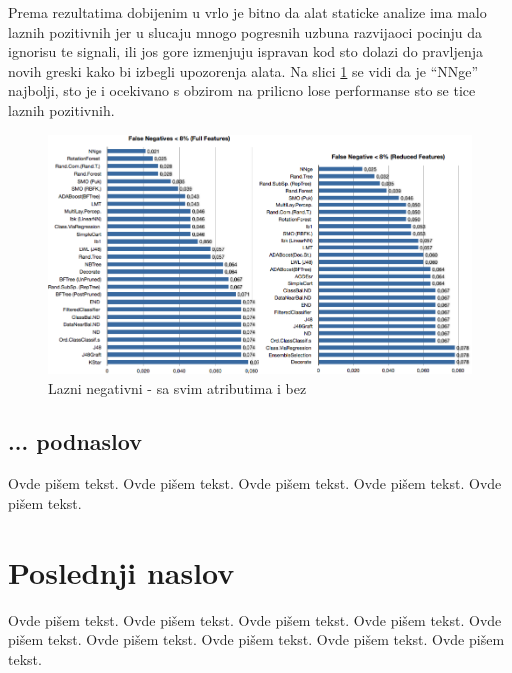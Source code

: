 \documentclass[a4paper]{article}
\begin{document}
{%

Prema rezultatima dobijenim u  \cite{baca} vrlo je bitno da alat staticke analize ima malo laznih pozitivnih jer
u slucaju mnogo pogresnih uzbuna razvijaoci pocinju da ignorisu te signali, ili jos gore izmenjuju ispravan kod sto dolazi 
do pravljenja novih greski kako bi izbegli upozorenja alata. Na slici \ref{fig:falseNeg} se vidi da je ``NNge'' najbolji, sto je i ocekivano s obzirom na prilicno 
lose performanse sto se tice laznih pozitivnih.

\begin{figure}[h!]
\centering
\includegraphics[width=\textwidth]{false_negative.png}
\caption{Lazni negativni - sa svim atributima i bez}
\label{fig:falseNeg}
\end{figure}




\subsection{... podnaslov}
\label{subsec:podnaslovM}

Ovde pišem tekst. 
Ovde pišem tekst. 
Ovde pišem tekst. 
Ovde pišem tekst. 
Ovde pišem tekst. 

\section{Poslednji naslov}
\label{sec:naslovM}

Ovde pišem tekst. 
Ovde pišem tekst. 
Ovde pišem tekst. 
Ovde pišem tekst. 
Ovde pišem tekst. 
Ovde pišem tekst. 
Ovde pišem tekst. 
Ovde pišem tekst. 
Ovde pišem tekst. 

}
\end{document}
